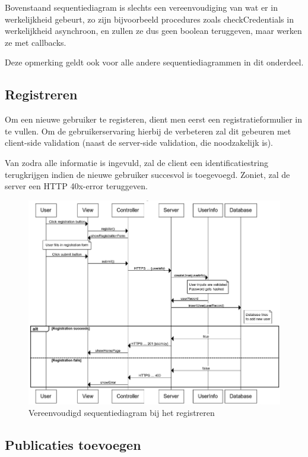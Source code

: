 \documentclass{article}
\begin{document}
Bovenstaand sequentiediagram is slechts een vereenvoudiging van wat er in werkelijkheid gebeurt, zo zijn bijvoorbeeld procedures zoals checkCredentials in werkelijkheid asynchroon, en zullen ze dus geen boolean teruggeven, maar werken ze met callbacks.

Deze opmerking geldt ook voor alle andere sequentiediagrammen in dit onderdeel.

\subsection{Registreren}

Om een nieuwe gebruiker te registeren, dient men eerst een registratieformulier in te vullen. Om de gebruikerservaring hierbij de verbeteren zal dit gebeuren met client-side validation (naast de server-side validation, die noodzakelijk is). 

Van zodra alle informatie is ingevuld, zal de client een identificatiestring terugkrijgen indien de nieuwe gebruiker succesvol is toegevoegd. Zoniet, zal de server een HTTP 40x-error teruggeven.

\begin{figure}[!h]
\centering
 \includegraphics[width=145mm]{registration-sequence.png}
 \caption{Vereenvoudigd sequentiediagram bij het registreren}
 \label{register-sequence}
\end{figure}

\subsection{Publicaties toevoegen}
\end{document}

